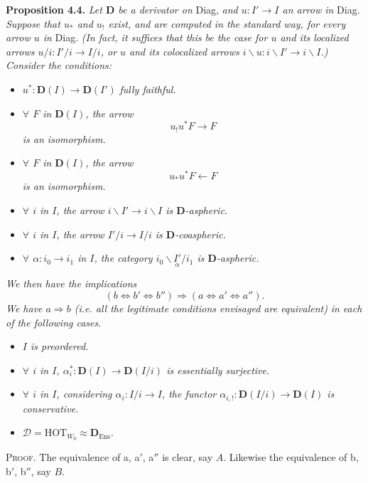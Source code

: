 \documentclass[11pt]{article}
\newcommand{\msp}[1]{\marginpar{\footnotesize [#1]}}
\newcommand{\bD}{\mathbf{D}}
\begin{document}
\textbf{Proposition 4.4.} \textit{Let $\bD$ be a derivator on} Diag, \textit{and $u : I' \longrightarrow I$ an arrow in} Diag. \textit{Suppose that $u_*$ and $u_!$ exist, and are computed in the standard way, for every arrow $u$ in} Diag. \textit{(In fact, it suffices that this be the case for $u$ and its localized arrows $u/i : I'/i \longrightarrow I/i$, or $u$ and its colocalized arrows $i\backslash u : i\backslash I' \longrightarrow i\backslash I$.) Consider the conditions:} %
\begin{itemize}[leftmargin=4em]
\item[\textit{a)}] $u^* : \bD(I) \longrightarrow \bD(I')$ \textit{fully faithful.}
\item[\textit{a$'$)}] \textit{$\forall$ $F$ in $\bD(I)$, the arrow}
\[
u_!u^*F \longrightarrow F
\]
\textit{is an isomorphism.}
\item[\textit{a$''$)}] \textit{$\forall$ $F$ in $\bD(I)$, the arrow}
\[
u_*u^*F \longleftarrow F
\]
\textit{is an isomorphism.}
\item[\textit{b)}] \textit{$\forall$ $i$ in $I$, the arrow $i\backslash I' \longrightarrow i\backslash I$ is $\bD$-aspheric.}
\item[\textit{b$'$)}] \textit{$\forall$ $i$ in $I$, the arrow $I'/i \longrightarrow I/i$ is $\bD$-coaspheric.}
\item[\textit{b$''$)}] \textit{$\forall$ $\alpha : i_0 \longrightarrow i_1$ in $I$, the category $i_0\backslash\underset{\alpha}{I'}/i_1$ is $\bD$-aspheric.}
\end{itemize}
\textit{We then have the implications}
\[
(b \Longleftrightarrow b' \Longleftrightarrow b'') \Longrightarrow (a \Longleftrightarrow a' \Longleftrightarrow a'').
\]
\textit{We have $a \Longrightarrow b$ (i.e. all the legitimate conditions envisaged are equivalent)} \msp{page 61}\textit{in each of the following cases.}
\begin{itemize}[leftmargin=4em]
\item[$1^o$] \textit{$I$ is preordered.}
\item[$2^o$] \textit{$\forall$ $i$ in $I$, $\alpha_i^* : \bD(I) \longrightarrow \bD(I/i)$ is essentially surjective.}
\item[$3^o$] \textit{$\forall$ $i$ in $I$, considering $\alpha_i : I/i \longrightarrow I$, the functor $\alpha_{i,!} : \bD(I/i) \longrightarrow \bD(I)$ is conservative.}
\item[$4^o$] $\mathcal{D} = \mathrm{HOT}_{W_0} \approx \bD_{\mathrm{Ens}}$.
\end{itemize}
\textsc{Proof}. The equivalence of a, a$'$, a$''$ is clear, say $A$. Likewise the equivalence of b, b$'$, b$''$, say $B$. %
\end{document}
